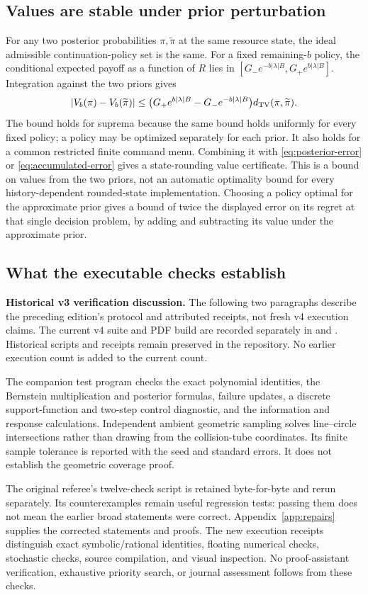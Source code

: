 \subsection{Values are stable under prior perturbation}
For any two posterior probabilities $\pi,\widetilde\pi$ at the same resource
state, the ideal admissible continuation-policy set is the same. For a
fixed remaining-$b$ policy, the conditional expected payoff as a function of
$R$ lies in $[G_-e^{-b|\lambda|B},G_+e^{b|\lambda|B}]$. Integration against
the two priors gives
\begin{equation}
 |V_b(\pi)-V_b(\widetilde\pi)|\le
 \bigl(G_+e^{b|\lambda|B}-G_-e^{-b|\lambda|B}\bigr)
                         d_{\mathrm{TV}}(\pi,\widetilde\pi).
 \label{eq:value-stability}
\end{equation}
The bound holds for suprema because the same bound holds uniformly for
every fixed policy; a policy may be optimized separately for each prior.
It also holds for a common restricted finite command menu. Combining it
with \eqref{eq:posterior-error} or \eqref{eq:accumulated-error} gives a
state-rounding value certificate. This is a bound on values from the two
priors, not an automatic optimality bound for every history-dependent
rounded-state implementation. Choosing a policy optimal for the approximate
prior gives a bound of twice the displayed error on its regret at that
single decision problem, by adding and subtracting its value under the
approximate prior.

\subsection{What the executable checks establish}
\noindent\textbf{Historical v3 verification discussion.} The following two
paragraphs describe the preceding edition's protocol and attributed receipts,
not fresh v4 execution claims. The current v4 suite and PDF build are recorded
separately in  and
. Historical scripts and receipts remain
preserved in the repository. No earlier execution count is added to the
current count.\par
The companion test program checks the exact polynomial identities, the
Bernstein multiplication and posterior formulas, failure updates, a discrete
support-function and two-step control diagnostic, and the information and
response calculations. Independent ambient geometric sampling solves
line--circle intersections rather than drawing from the collision-tube
coordinates. Its finite sample tolerance is reported with the seed and
standard errors. It does not establish the geometric coverage proof.

The original referee's twelve-check script is retained byte-for-byte and
rerun separately. Its counterexamples remain useful regression tests:
passing them does not mean the earlier broad statements were correct.
Appendix~\ref{app:repairs} supplies the corrected statements and proofs.
The new execution receipts distinguish exact symbolic/rational identities,
floating numerical checks, stochastic checks, source compilation, and visual
inspection. No proof-assistant verification, exhaustive priority search, or
journal assessment follows from these checks.
